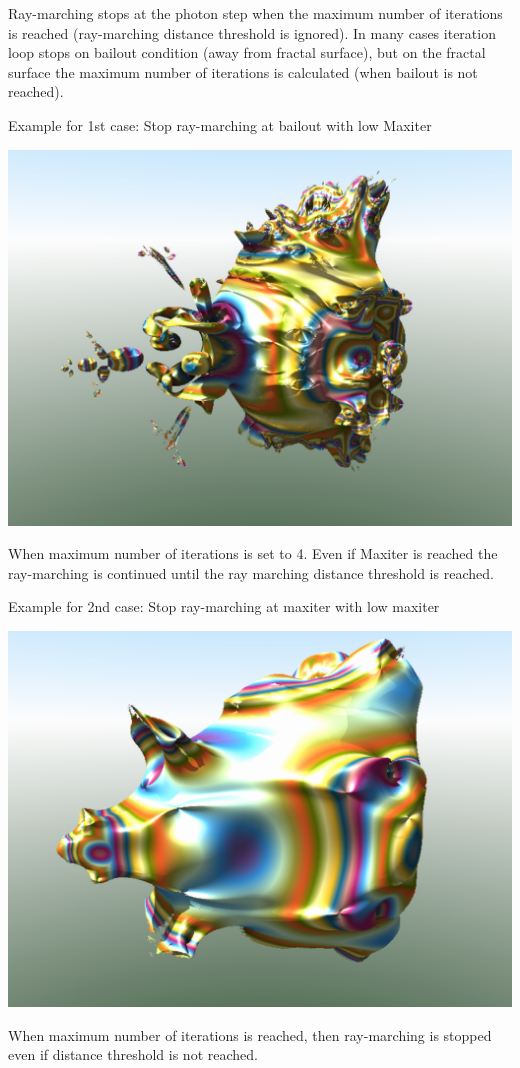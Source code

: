 Ray-marching stops at the photon step when the maximum number of iterations is
reached (ray-marching distance threshold is ignored). In many cases iteration
loop stops on bailout condition (away from fractal surface), but on the fractal
surface the maximum number of iterations is calculated (when bailout is not
reached).

Example for 1st case: Stop ray-marching at bailout with low Maxiter \nopagebreak

\includegraphics[width=0.5\linewidth]{img/manual/media/stop_raymarching_at_disttrhersh_iter4}

When maximum number of iterations is set to 4. Even if Maxiter is reached the
ray-marching is continued until the ray marching distance threshold is reached.


Example for 2nd case: Stop ray-marching at maxiter with low maxiter \nopagebreak

\includegraphics[width=0.5\linewidth]{img/manual/media/stop_raymarching_at_maxiter_iter4}

When maximum number of iterations is reached, then ray-marching is stopped even
if distance threshold is not reached.


